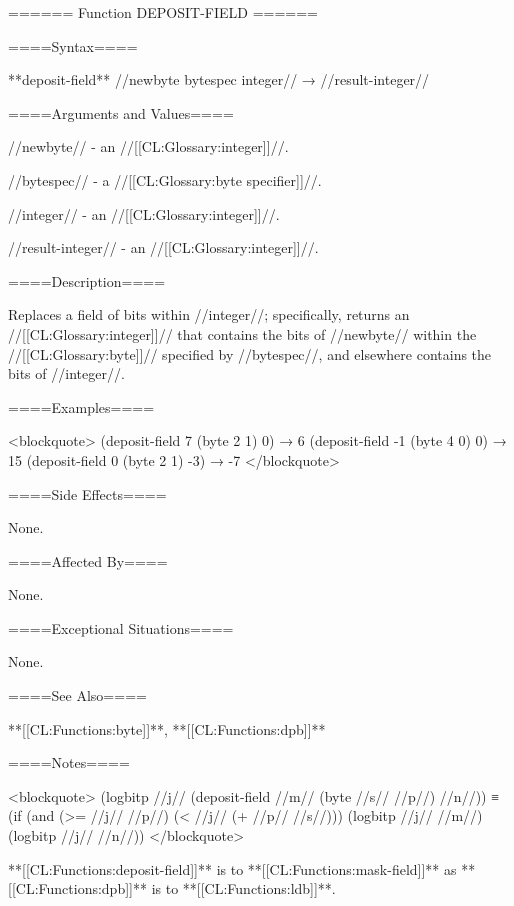 ====== Function DEPOSIT-FIELD ======

====Syntax====

**deposit-field** //newbyte bytespec integer// → //result-integer//

====Arguments and Values====

//newbyte// - an //[[CL:Glossary:integer]]//.

//bytespec// - a //[[CL:Glossary:byte specifier]]//.

//integer// - an //[[CL:Glossary:integer]]//.

//result-integer// - an //[[CL:Glossary:integer]]//.

====Description====

Replaces a field of bits within //integer//; specifically, returns an //[[CL:Glossary:integer]]// that contains the bits of //newbyte// within the //[[CL:Glossary:byte]]// specified by //bytespec//, and elsewhere contains the bits of //integer//.

====Examples====

<blockquote> (deposit-field 7 (byte 2 1) 0) → 6 (deposit-field -1 (byte 4 0) 0) → 15 (deposit-field 0 (byte 2 1) -3) → -7 </blockquote>

====Side Effects====

None.

====Affected By====

None.

====Exceptional Situations====

None.

====See Also====

**[[CL:Functions:byte]]**, **[[CL:Functions:dpb]]**

====Notes====

<blockquote> (logbitp //j// (deposit-field //m// (byte //s// //p//) //n//)) ≡ (if (and (>= //j// //p//) (< //j// (+ //p// //s//))) (logbitp //j// //m//) (logbitp //j// //n//)) </blockquote>

**[[CL:Functions:deposit-field]]** is to **[[CL:Functions:mask-field]]** as **[[CL:Functions:dpb]]** is to **[[CL:Functions:ldb]]**.

